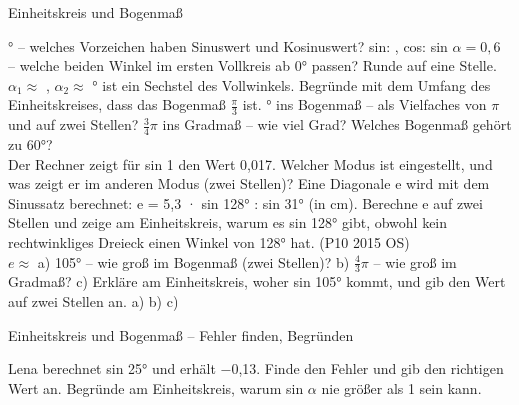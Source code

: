 \begin{aufgabe}{Einheitskreis und Bogenmaß}
\begin{teile}
\leerfeld
{}° – welches Vorzeichen haben Sinuswert und Kosinuswert? sin: \leerfeld, cos: \leerfeld
\teil sin $\alpha = 0{,}6$ – welche beiden Winkel im ersten Vollkreis ab 0° passen? Runde auf eine Stelle. $\alpha_1 \approx$ \leerfeld[°], $\alpha_2 \approx$ \leerfeld[°]
° ist ein Sechstel des Vollwinkels. Begründe mit dem Umfang des Einheitskreises, dass das Bogenmaß $\frac{\pi}{3}$ ist.
° ins Bogenmaß – als Vielfaches von $\pi$ und auf zwei Stellen? \leerfeld
\teil $\frac{3}{4}\pi$ ins Gradmaß – wie viel Grad? \leerfeld[°]
\teil Welches Bogenmaß gehört zu 60°?\\ 
\teil Der Rechner zeigt für sin 1 den Wert 0,017. Welcher Modus ist eingestellt, und was zeigt er im anderen Modus (zwei Stellen)? \leerfeld
\teil Eine Diagonale e wird mit dem Sinussatz berechnet: e = 5,3 · sin 128° : sin 31° (in cm). Berechne e auf zwei Stellen und zeige am Einheitskreis, warum es sin 128° gibt, obwohl kein rechtwinkliges Dreieck einen Winkel von 128° hat. \hfill (P10 2015 OS) \\ $e \approx$ \leerfeld[cm]
\teil a) 105° – wie groß im Bogenmaß (zwei Stellen)? b) $\frac{4}{3}\pi$ – wie groß im Gradmaß? c) Erkläre am Einheitskreis, woher sin 105° kommt, und gib den Wert auf zwei Stellen an. a) \leerfeld\quad b) \leerfeld[°]\quad c) \leerfeld
\end{teile}
\end{aufgabe}

\begin{aufgabe}{Einheitskreis und Bogenmaß – Fehler finden, Begründen}
\begin{teile}
\teil Lena berechnet sin 25° und erhält −0,13. Finde den Fehler und gib den richtigen Wert an.
\teil Begründe am Einheitskreis, warum sin $\alpha$ nie größer als 1 sein kann.
\end{teile}
\end{aufgabe}
